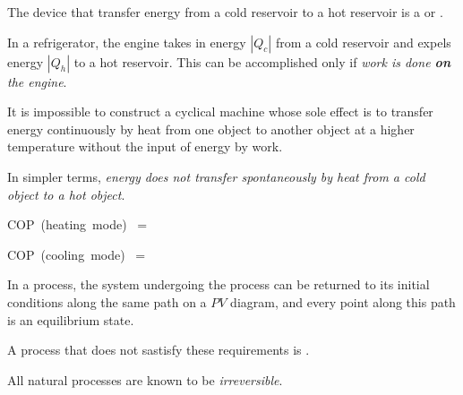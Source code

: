         \par The device that transfer energy from a cold reservoir to a hot reservoir is a
         or .
        \par In a refrigerator, the engine takes in energy $|Q_{c}|$ from a cold reservoir
        and expels energy $|Q_{h}|$ to a hot reservoir. This can be accomplished only if
        \textit{work is done \textbf{on} the engine}.
        \par It is impossible to construct a cyclical machine whose sole effect is to
        transfer energy continuously by heat from one object to another object at a higher
        temperature without the input of energy by work.
        \par In simpler terms, \textit{energy does not transfer spontaneously by heat
        from a cold object to a hot object}.
        \begin{eqbox}
            \mbox{COP (heating mode) } = 
        \end{eqbox}
        \begin{eqbox}
            \mbox{COP (cooling mode) } = 
        \end{eqbox}

        \par In a  process, the system undergoing the process can be
        returned to its initial conditions along the same path on a $PV$ diagram, and every
        point along this path is an equilibrium state.
        \par A process that does not sastisfy these requirements is .
        \par All natural processes are known to be \textit{irreversible}.

